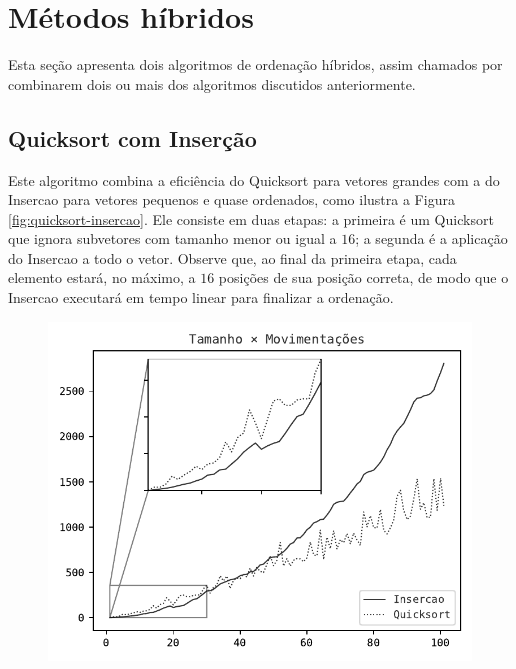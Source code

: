 \section{Métodos híbridos}
Esta seção apresenta dois algoritmos de ordenação híbridos, assim chamados por combinarem dois ou mais dos algoritmos discutidos anteriormente.

\subsection{Quicksort com Inserção}
Este algoritmo combina a eficiência do Quicksort para vetores grandes com a do Insercao para vetores pequenos e quase ordenados, como ilustra a Figura \ref{fig:quicksort-insercao}. Ele consiste em duas etapas: a primeira é um Quicksort que ignora subvetores com tamanho menor ou igual a $16$; a segunda é a aplicação do Insercao a todo o vetor. Observe que, ao final da primeira etapa, cada elemento estará, no máximo, a $16$ posições de sua posição correta, de modo que o Insercao executará em tempo linear para finalizar a ordenação.

\begin{figure}[H]
\centering
\includegraphics{figuras/pdf/quicksort-insercao.pdf}
\end{figure}



